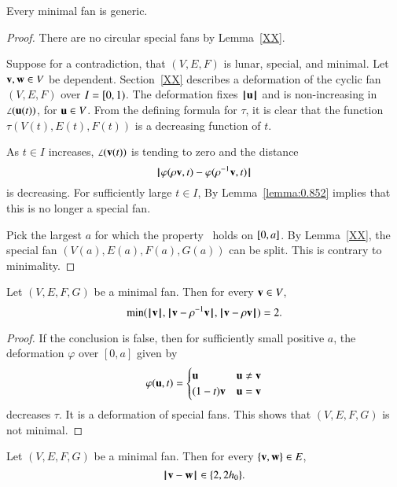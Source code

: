 \begin{lemma}
Every minimal fan is generic.
\end{lemma}

\begin{proof}  There are no circular special fans by Lemma~\ref{XX}.

Suppose for a contradiction, that $(V,E,F)$ is lunar, special, and
minimal.  Let ${\mathbf v},{\mathbf w}\in V$ be dependent.   Section~\ref{XX} describes a deformation of the cyclic fan $(V,E,F)$
over $I=[0,1)$.  The deformation fixes ${{\hskip0.1em|\hskip-0.15em|\hskip0.1em}{\mathbf u}{\hskip0.1em|\hskip-0.15em|\hskip0.1em}}$
and is non-increasing in $\angle({\mathbf u}(t))$, for ${\mathbf u}\in V$.
From the defining formula for $\tau$, it is clear that the function $\tau(V(t),E(t),F(t))$ is a decreasing function of $t$.

As $t\in I$ increases, $\angle({\mathbf v}(t))$ is tending to zero and the distance
$$
{\hskip0.1em|\hskip-0.15em|\hskip0.1em} \varphi(\rho {\mathbf v},t) - \varphi(\rho^{-1} {\mathbf v},t){\hskip0.1em|\hskip-0.15em|\hskip0.1em}
$$
is decreasing.
For sufficiently large $t\in I$, 
By Lemma~\ref{lemma:0.852} implies that this is no longer a special fan.

Pick the largest $a$ for which the property~ holds on
$[0,a]$.
By Lemma~\ref{XX}, the special fan $(V(a),E(a),F(a),G(a))$ can be split.
This is contrary to minimality.
\end{proof}

\begin{lemma}
Let $(V,E,F,G)$ be a minimal fan.  Then for every ${\mathbf v}\in V$,
$$
\min({{\hskip0.1em|\hskip-0.15em|\hskip0.1em}{\mathbf v}{\hskip0.1em|\hskip-0.15em|\hskip0.1em}},{\hskip0.1em|\hskip-0.15em|\hskip0.1em}{\mathbf v} - \rho^{-1}{\mathbf v}{\hskip0.1em|\hskip-0.15em|\hskip0.1em},{\hskip0.1em|\hskip-0.15em|\hskip0.1em}{\mathbf v} - \rho {\mathbf v}{\hskip0.1em|\hskip-0.15em|\hskip0.1em}) = 2.
$$
\end{lemma}

\begin{proof} If the conclusion is false, then for sufficiently small positive $a$,  the deformation $\varphi$ over $[0,a]$ given by
$$
\varphi({\mathbf u},t) =
\begin{cases}
{\mathbf u} & {\mathbf u} \ne {\mathbf v}\\
(1-t) {\mathbf v} & {\mathbf u} = {\mathbf v}\\
\end{cases}
$$
decreases $\tau$.  It is a deformation of special fans.  This shows that $(V,E,F,G)$ is not minimal.
\end{proof}

\begin{lemma}
Let $(V,E,F,G)$ be a minimal fan.  Then for every $\{{\mathbf v},{\mathbf w}\}\in E$,
$$
{\hskip0.1em|\hskip-0.15em|\hskip0.1em}{\mathbf v} - {\mathbf w}{\hskip0.1em|\hskip-0.15em|\hskip0.1em} \in \{2,2{h_0}\}.
$$
\end{lemma}

